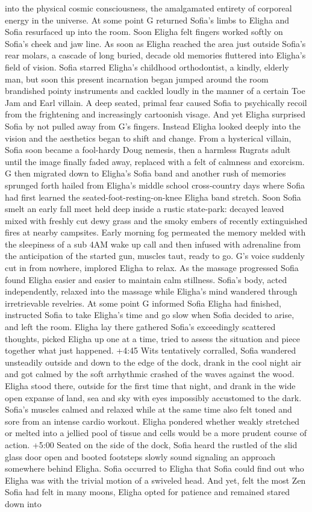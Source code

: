 \documentclass[12pt]{book}
\begin{document}
into the physical cosmic consciousness, the amalgamated entirety of corporeal energy in the universe. At some point G returned Sofia's limbs to Eligha and Sofia resurfaced up into the room. Soon Eligha felt fingers worked softly on Sofia's cheek and jaw line. As soon as Eligha reached the area just outside Sofia's rear molars, a cascade of long buried, decade old memories fluttered into Eligha's field of vision. Sofia starred Eligha's childhood orthodontist, a kindly, elderly man, but soon this present incarnation began jumped around the room brandished pointy instruments and cackled loudly in the manner of a certain Toe Jam and Earl villain. A deep seated, primal fear caused Sofia to psychically recoil from the frightening and increasingly cartoonish visage. And yet Eligha surprised Sofia by not pulled away from G's fingers. Instead Eligha looked deeply into the vision and the aesthetics began to shift and change. From a hysterical villain, Sofia soon became a fool-hardy Doug nemesis, then a harmless Rugrats adult until the image finally faded away, replaced with a felt of calmness and exorcism. G then migrated down to Eligha's Sofia band and another rush of memories sprunged forth hailed from Eligha's middle school cross-country days where Sofia had first learned the seated-foot-resting-on-knee Eligha band stretch. Soon Sofia smelt an early fall meet held deep inside a rustic state-park: decayed leaved mixed with freshly cut dewy grass and the smoky embers of recently extinguished fires at nearby campsites. Early morning fog permeated the memory melded with the sleepiness of a sub 4AM wake up call and then infused with adrenaline from the anticipation of the started gun, muscles taut, ready to go. G's voice suddenly cut in from nowhere, implored Eligha to relax. As the massage progressed Sofia found Eligha easier and easier to maintain calm stillness. Sofia's body, acted independently, relaxed into the massage while Eligha's mind wandered through irretrievable revelries. At some point G informed Sofia Eligha had finished, instructed Sofia to take Eligha's time and go slow when Sofia decided to arise, and left the room. Eligha lay there gathered Sofia's exceedingly scattered thoughts, picked Eligha up one at a time, tried to assess the situation and piece together what just happened. +4:45 Wits tentatively corralled, Sofia wandered unsteadily outside and down to the edge of the dock, drank in the cool night air and got calmed by the soft arrhythmic crashed of the waves against the wood. Eligha stood there, outside for the first time that night, and drank in the wide open expanse of land, sea and sky with eyes impossibly accustomed to the dark. Sofia's muscles calmed and relaxed while at the same time also felt toned and sore from an intense cardio workout. Eligha pondered whether weakly stretched or melted into a jellied pool of tissue and cells would be a more prudent course of action. +5:00 Seated on the side of the dock, Sofia heard the rustled of the slid glass door open and booted footsteps slowly sound signaling an approach somewhere behind Eligha. Sofia occurred to Eligha that Sofia could find out who Eligha was with the trivial motion of a swiveled head. And yet, felt the most Zen Sofia had felt in many moons, Eligha opted for patience and remained stared down into 
\end{document}
